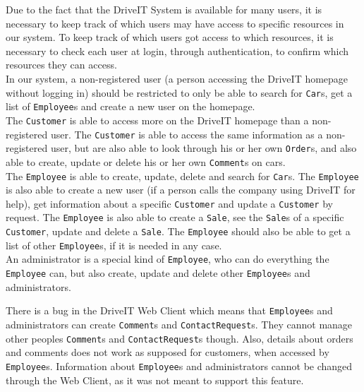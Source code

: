 Due to the fact that the DriveIT System is available for many users, it is necessary to keep track of which users may have access to specific resources in our system. To keep track of which users got access to which resources, it is necessary to check each user at login, through authentication, to confirm which resources they can access.\\

In our system, a non-registered user (a person accessing the DriveIT homepage without logging in) should be restricted to only be able to search for \texttt{Car}s, get a list of \texttt{Employee}s and create a new user on the homepage.\\

The \texttt{Customer} is able to access more on the DriveIT homepage than a non-registered user. The \texttt{Customer} is able to access the same information as a non-registered user, but are also able to look through his or her own \texttt{Order}s, and also able to create, update or delete his or her own \texttt{Comment}s on cars.\\

The \texttt{Employee} is able to create, update, delete and search for \texttt{Car}s. The \texttt{Employee} is also able to create a new user (if a person calls the company using DriveIT for help), get information about a specific \texttt{Customer} and update a \texttt{Customer} by request. The \texttt{Employee} is also able to create a \texttt{Sale}, see the \texttt{Sale}s of a specific \texttt{Customer}, update and delete a \texttt{Sale}. The \texttt{Employee} should also be able to get a list of other \texttt{Employee}s, if it is needed in any case.\\

An administrator is a special kind of \texttt{Employee}, who can do everything the \texttt{Employee} can, but also create, update and delete other \texttt{Employee}s and administrators.

There is a bug in the DriveIT Web Client which means that \texttt{Employee}s and administrators can create \texttt{Comment}s and \texttt{ContactRequest}s. They cannot manage other peoples \texttt{Comment}s and \texttt{ContactRequest}s though. Also, details about orders and comments does not work as supposed for customers, when accessed by \texttt{Employee}s. Information about \texttt{Employee}s and administrators cannot be changed through the Web Client, as it was not meant to support this feature.